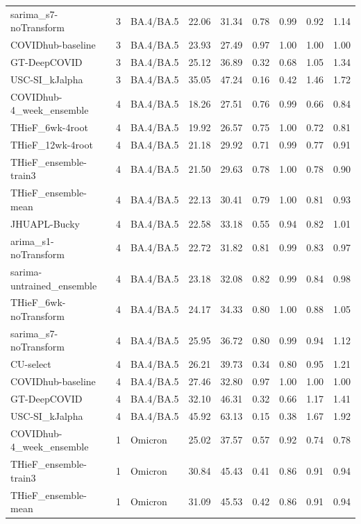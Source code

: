 \documentclass[12pt]{article}
\begin{document}
\begin{longtable}{lrlrrrrrr}
  sarima\_s7-noTransform & 3 & BA.4/BA.5 & 22.06 & 31.34 & 0.78 & 0.99 & 0.92 & 1.14 \\ 
  COVIDhub-baseline & 3 & BA.4/BA.5 & 23.93 & 27.49 & 0.97 & 1.00 & 1.00 & 1.00 \\ 
  GT-DeepCOVID & 3 & BA.4/BA.5 & 25.12 & 36.89 & 0.32 & 0.68 & 1.05 & 1.34 \\ 
  USC-SI\_kJalpha & 3 & BA.4/BA.5 & 35.05 & 47.24 & 0.16 & 0.42 & 1.46 & 1.72 \\ 
  COVIDhub-4\_week\_ensemble & 4 & BA.4/BA.5 & 18.26 & 27.51 & 0.76 & 0.99 & 0.66 & 0.84 \\ 
  THieF\_6wk-4root & 4 & BA.4/BA.5 & 19.92 & 26.57 & 0.75 & 1.00 & 0.72 & 0.81 \\ 
  THieF\_12wk-4root & 4 & BA.4/BA.5 & 21.18 & 29.92 & 0.71 & 0.99 & 0.77 & 0.91 \\ 
  THieF\_ensemble-train3 & 4 & BA.4/BA.5 & 21.50 & 29.63 & 0.78 & 1.00 & 0.78 & 0.90 \\ 
  THieF\_ensemble-mean & 4 & BA.4/BA.5 & 22.13 & 30.41 & 0.79 & 1.00 & 0.81 & 0.93 \\ 
  JHUAPL-Bucky & 4 & BA.4/BA.5 & 22.58 & 33.18 & 0.55 & 0.94 & 0.82 & 1.01 \\ 
  arima\_s1-noTransform & 4 & BA.4/BA.5 & 22.72 & 31.82 & 0.81 & 0.99 & 0.83 & 0.97 \\ 
  sarima-untrained\_ensemble & 4 & BA.4/BA.5 & 23.18 & 32.08 & 0.82 & 0.99 & 0.84 & 0.98 \\ 
  THieF\_6wk-noTransform & 4 & BA.4/BA.5 & 24.17 & 34.33 & 0.80 & 1.00 & 0.88 & 1.05 \\ 
  sarima\_s7-noTransform & 4 & BA.4/BA.5 & 25.95 & 36.72 & 0.80 & 0.99 & 0.94 & 1.12 \\ 
  CU-select & 4 & BA.4/BA.5 & 26.21 & 39.73 & 0.34 & 0.80 & 0.95 & 1.21 \\ 
  COVIDhub-baseline & 4 & BA.4/BA.5 & 27.46 & 32.80 & 0.97 & 1.00 & 1.00 & 1.00 \\ 
  GT-DeepCOVID & 4 & BA.4/BA.5 & 32.10 & 46.31 & 0.32 & 0.66 & 1.17 & 1.41 \\ 
  USC-SI\_kJalpha & 4 & BA.4/BA.5 & 45.92 & 63.13 & 0.15 & 0.38 & 1.67 & 1.92 \\ 
  COVIDhub-4\_week\_ensemble & 1 & Omicron & 25.02 & 37.57 & 0.57 & 0.92 & 0.74 & 0.78 \\ 
  THieF\_ensemble-train3 & 1 & Omicron & 30.84 & 45.43 & 0.41 & 0.86 & 0.91 & 0.94 \\ 
  THieF\_ensemble-mean & 1 & Omicron & 31.09 & 45.53 & 0.42 & 0.86 & 0.91 & 0.94 \\ 

\end{longtable}
\end{document}
